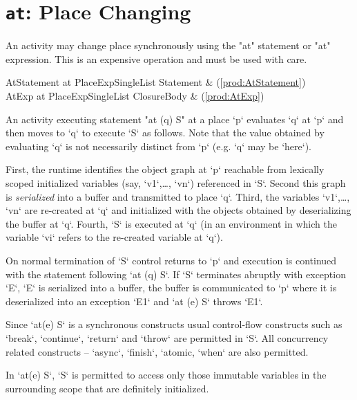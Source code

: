 \section{ {\tt at}: Place Changing}\label{AtStatement}

An activity may change place synchronously using the \xcd"at" statement or
\xcd"at" expression. This is an expensive operation and must be used
with care.

\begin{bbgrammar}
 AtStatement    \: at PlaceExpSingleList Statement & (\ref{prod:AtStatement})\\%
 AtExp    \: at PlaceExpSingleList ClosureBody & (\ref{prod:AtExp})\\%
\end{bbgrammar}



An activity executing statement \xcd"at (q) S" at a place \xcd`p`
evaluates \xcd`q` at \xcd`p` and then moves to \xcd`q` to execute
\xcd`S` as follows. Note that the value obtained by evaluating \xcd`q`
is not necessarily distinct from \xcd`p` (e.g.{} \xcd`q` may be
\xcd`here`).

First, the runtime identifies the object graph at \xcd`p` reachable
from lexically scoped initialized variables (say, \xcd`v1`,\ldots,
\xcd`vn`) referenced in \xcd`S`.  Second this graph is {\em
  serialized} into a buffer and transmitted to place \xcd`q`.  Third,
the variables \xcd`v1`,\ldots, \xcd`vn` are re-created at \xcd`q` and
initialized with the objects obtained by deserializing the buffer at
\xcd`q`. Fourth, \xcd`S` is executed at \xcd`q` (in an environment in
which the variable \xcd`vi` refers to the re-created variable at
\xcd`q`).

On normal termination of \xcd`S` control returns to \xcd`p` and
execution is continued with the statement following \xcd`at (q) S`. If
\xcd`S` terminates abruptly with exception \xcd`E`, \xcd`E` is
serialized into a buffer, the buffer is communicated to \xcd`p` where
it is deserialized into an exception \xcd`E1` and \xcd`at (e) S`
throws \xcd`E1`.

Since \xcd`at(e) S` is a synchronous constructs usual control-flow
constructs such as \xcd`break`, \xcd`continue`, \xcd`return` and 
\xcd`throw` are permitted in \xcd`S`.  All concurrency related
constructs -- \xcd`async`, \xcd`finish`, \xcd`atomic, \xcd`when` are
also permitted.

\limitationx{} In \xcd`at(e) S`, \xcd`S` is permitted to access only
those immutable variables in the surrounding scope that are definitely
initialized.

